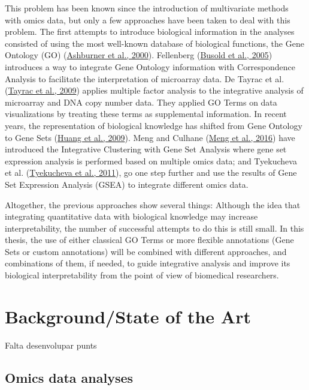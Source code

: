 \documentclass[a4paper, nobind]{templates/ociamthesis}
\begin{document}
This problem has been known since the introduction of multivariate methods with omics data, but only a few approaches have been taken to deal with this problem. The first attempts to introduce biological information in the analyses consisted of using the most well-known database of biological functions, the Gene Ontology (GO) (\protect\hyperlink{ref-ashburner_gene_2000}{Ashburner et al., 2000}). Fellenberg (\protect\hyperlink{ref-busold_integration_2005}{Busold et al., 2005}) introduces a way to integrate Gene Ontology information with Correspondence Analysis to facilitate the interpretation of microarray data. De Tayrac et al. (\protect\hyperlink{ref-de_tayrac_simultaneous_2009}{Tayrac et al., 2009}) applies multiple factor analysis to the integrative analysis of microarray and DNA copy number data. They applied GO Terms on data visualizations by treating these terms as supplemental information. In recent years, the representation of biological knowledge has shifted from Gene Ontology to Gene Sets (\protect\hyperlink{ref-huang_bioinformatics_2009}{Huang et al., 2009}). Meng and Culhane (\protect\hyperlink{ref-meng_dimension_2016}{Meng et al., 2016}) have introduced the Integrative Clustering with Gene Set Analysis where gene set expression analysis is performed based on multiple omics data; and Tyekucheva et al. (\protect\hyperlink{ref-tyekucheva_integrating_2011}{Tyekucheva et al., 2011}), go one step further and use the results of Gene Set Expression Analysis (GSEA) to integrate different omics data.

Altogether, the previous approaches show several things: Although the idea that integrating quantitative data with biological knowledge may increase interpretability, the number of successful attempts to do this is still small. In this thesis, the use of either classical GO Terms or more flexible annotations (Gene Sets or custom annotations) will be combined with different approaches, and combinations of them, if needed, to guide integrative analysis and improve its biological interpretability from the point of view of biomedical researchers.

\hypertarget{backgroundstate-of-the-art}{%
\section{Background/State of the Art}\label{backgroundstate-of-the-art}}

Falta desenvolupar punts

\hypertarget{omics-data-analyses}{%
\subsection{Omics data analyses}\label{omics-data-analyses}}
\end{document}
